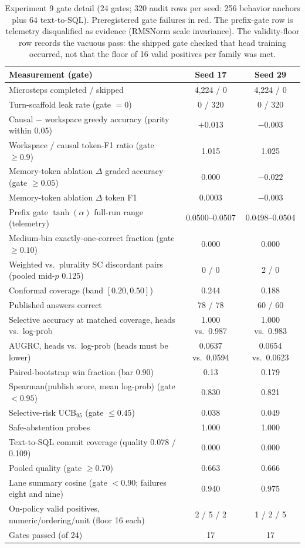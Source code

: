 \documentclass[10pt,a4paper]{article}
\newcommand{\fail}[1]{\textcolor{failred}{#1}}
\begin{document}
\begin{table}[htbp]
\caption{Experiment 9 gate detail (24 gates; 320 audit rows per seed: 256 behavior anchors plus 64 text-to-SQL). Preregistered gate failures in red. The prefix-gate row is telemetry disqualified as evidence (RMSNorm scale invariance). The validity-floor row records the vacuous pass: the shipped gate checked that head training occurred, not that the floor of 16 valid positives per family was met.}
\label{tab:gates-exp9}
\centering\footnotesize
\begin{tabularx}{\textwidth}{@{}Xcc@{}}
\toprule
Measurement (gate) & Seed 17 & Seed 29 \\
\midrule
Microsteps completed / skipped & 4,224 / 0 & 4,224 / 0 \\
Turn-scaffold leak rate (gate $=0$) & 0 / 320 & 0 / 320 \\
Causal $-$ workspace greedy accuracy (parity within 0.05) & $+0.013$ & $-0.003$ \\
Workspace / causal token-F1 ratio (gate $\geq 0.9$) & 1.015 & 1.025 \\
Memory-token ablation $\Delta$ graded accuracy (gate $\geq 0.05$) & \fail{0.000} & \fail{$-0.022$} \\
Memory-token ablation $\Delta$ token F1 & 0.0003 & $-0.003$ \\
Prefix gate $\tanh(\alpha)$ full-run range (telemetry) & 0.0500--0.0507 & 0.0498--0.0504 \\
Medium-bin exactly-one-correct fraction (gate $\geq 0.10$) & \fail{0.000} & \fail{0.000} \\
Weighted vs.\ plurality SC discordant pairs (pooled mid-$p$ 0.125) & 0 / 0 & 2 / 0 \\
Conformal coverage (band $[0.20, 0.50]$) & 0.244 & \fail{0.188} \\
Published answers correct & 78 / 78 & 60 / 60 \\
Selective accuracy at matched coverage, heads vs.\ log-prob & 1.000 vs.\ 0.987 & 1.000 vs.\ 0.983 \\
AUGRC, heads vs.\ log-prob (heads must be lower) & \fail{0.0637 vs.\ 0.0594} & \fail{0.0654 vs.\ 0.0623} \\
Paired-bootstrap win fraction (bar 0.90) & \fail{0.13} & \fail{0.179} \\
Spearman(publish score, mean log-prob) (gate $<0.95$) & 0.830 & 0.821 \\
Selective-risk UCB$_{95}$ (gate $\leq 0.45$) & 0.038 & 0.049 \\
Safe-abstention probes & 1.000 & 1.000 \\
Text-to-SQL commit coverage (quality 0.078 / 0.109) & 0.000 & 0.000 \\
Pooled quality (gate $\geq 0.70$) & \fail{0.663} & \fail{0.666} \\
Lane summary cosine (gate $<0.90$; failures eight and nine) & \fail{0.940} & \fail{0.975} \\
On-policy valid positives, numeric/ordering/unit (floor 16 each) & 2 / 5 / 2 & 1 / 2 / 5 \\
Gates passed (of 24) & 17 & 17 \\
\bottomrule
\end{tabularx}
\end{table}
\end{document}
